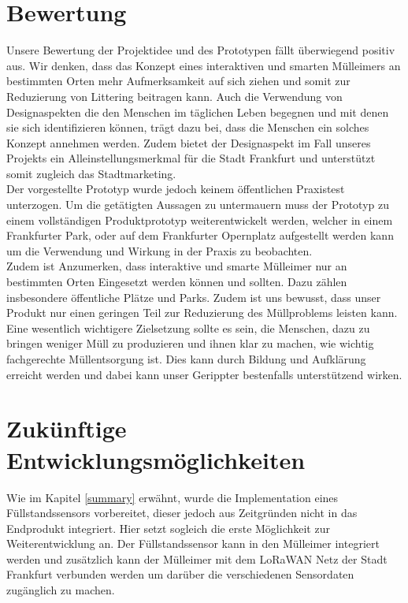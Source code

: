 \chapter{Bewertung}
    Unsere Bewertung der Projektidee und des Prototypen fällt überwiegend positiv aus. Wir denken, dass das Konzept eines interaktiven und smarten Mülleimers an bestimmten Orten mehr Aufmerksamkeit auf sich ziehen und somit zur Reduzierung von Littering beitragen kann. Auch die Verwendung von Designaspekten die den Menschen im täglichen Leben begegnen und mit denen sie sich identifizieren können, trägt dazu bei, dass die Menschen ein solches Konzept annehmen werden. Zudem bietet der Designaspekt im Fall unseres Projekts ein Alleinstellungsmerkmal für die Stadt Frankfurt und unterstützt somit zugleich das Stadtmarketing.\\

    Der vorgestellte Prototyp wurde jedoch keinem öffentlichen Praxistest unterzogen. Um die getätigten Aussagen zu untermauern muss der Prototyp zu einem vollständigen Produktprototyp weiterentwickelt werden, welcher in einem Frankfurter Park, oder auf dem Frankfurter Opernplatz aufgestellt werden kann um die Verwendung und Wirkung in der Praxis zu beobachten.\\

    Zudem ist Anzumerken, dass interaktive und smarte Mülleimer nur an bestimmten Orten Eingesetzt werden können und sollten. Dazu zählen insbesondere öffentliche Plätze und Parks. Zudem ist uns bewusst, dass unser Produkt nur einen geringen Teil zur Reduzierung des Müllproblems leisten kann. Eine wesentlich wichtigere Zielsetzung sollte es sein, die Menschen, dazu zu bringen weniger Müll zu produzieren und ihnen klar zu machen, wie wichtig fachgerechte Müllentsorgung ist. Dies kann durch Bildung und Aufklärung erreicht werden und dabei kann unser Gerippter bestenfalls unterstützend wirken.


\chapter{Zukünftige Entwicklungsmöglichkeiten}
    Wie im Kapitel \ref{summary} erwähnt, wurde die Implementation eines Füllstandssensors vorbereitet, dieser jedoch aus Zeitgründen nicht in das Endprodukt integriert. Hier setzt sogleich die erste Möglichkeit zur Weiterentwicklung an. Der Füllstandssensor kann in den Mülleimer integriert werden und zusätzlich kann der Mülleimer mit dem LoRaWAN Netz der Stadt Frankfurt verbunden werden um darüber die verschiedenen Sensordaten zugänglich zu machen.\\

